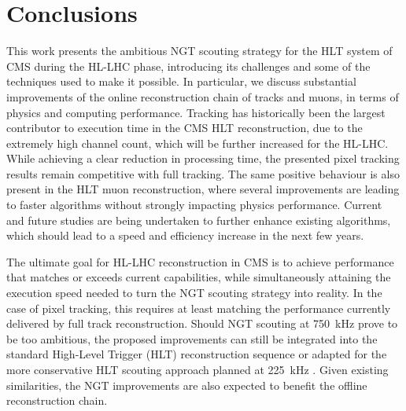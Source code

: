 \documentclass{webofc}
\begin{document}
\section{Conclusions}
\label{sec:conclusions}
%
This work presents the ambitious NGT scouting strategy for the HLT system of CMS during the HL-LHC phase, introducing its challenges and some of the techniques used to make it possible.
In particular, we discuss substantial improvements of the online reconstruction chain of tracks and muons, in terms of physics and computing performance.
Tracking has historically been the largest contributor to execution time in the CMS HLT reconstruction, due to the extremely high channel count, which will be further increased for the HL-LHC.
While achieving a clear reduction in processing time, the presented pixel tracking results remain competitive with full tracking.
The same positive behaviour is also present in the HLT muon reconstruction, where several improvements are leading to faster algorithms without strongly impacting physics performance.
Current and future studies are being undertaken to further enhance existing algorithms, which should lead to a speed and efficiency increase in the next few years. \par
%
The ultimate goal for HL-LHC reconstruction in CMS is to achieve performance that matches or exceeds current capabilities, while simultaneously attaining the execution speed needed to turn the NGT scouting strategy into reality.
In the case of pixel tracking, this requires at least matching the performance currently delivered by full track reconstruction.
Should NGT scouting at \SI{750}{\kilo\hertz} prove to be too ambitious, the proposed improvements can still be integrated into the standard High-Level Trigger (HLT) reconstruction sequence or adapted for the more conservative HLT scouting approach planned at \SI{225}{\kilo\hertz} \cite{octdr}.
Given existing similarities, the NGT improvements are also expected to benefit the offline reconstruction chain. \par
%
\end{document}
